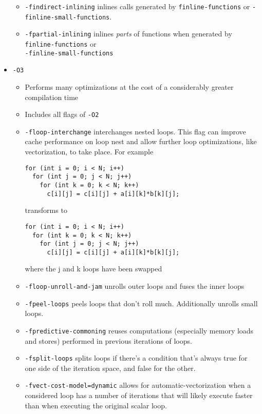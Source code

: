 \documentclass{article}
\begin{document}
\begin{itemize}
\begin{itemize}
                    \item \verb|-findirect-inlining| inlines calls generated by \verb|finline-functions| or \verb|-finline-small-functions|.
                    \item \verb|-fpartial-inlining| inlines \emph{parts} of functions when generated by \verb|finline-functions| or\\ \verb|-finline-small-functions|
                \end{itemize}
            \item \verb|-O3|
                \begin{itemize}
                    \item Performs many optimizations at the cost of a considerably greater compilation time
                    \item Includes all flags of \verb|-O2|
                    \item \verb|-floop-interchange| interchanges nested loops.  This flag can improve cache performance on loop nest and allow further loop optimizations, like vectorization, to take place. For example
                    \begin{verbatim}
for (int i = 0; i < N; i++)
  for (int j = 0; j < N; j++)
    for (int k = 0; k < N; k++)
      c[i][j] = c[i][j] + a[i][k]*b[k][j];
                    \end{verbatim}
                    transforms to 
                    \begin{verbatim}
for (int i = 0; i < N; i++)
  for (int k = 0; k < N; k++)
    for (int j = 0; j < N; j++)
      c[i][j] = c[i][j] + a[i][k]*b[k][j];
                    \end{verbatim}
                    where the j and k loops have been swapped
                    \item \verb|-floop-unroll-and-jam| unrolls outer loops and fuses the inner loops
                    \item \verb|-fpeel-loops| peels loops that don't roll much.  Additionally unrolls small loops.
                    \item \verb|-fpredictive-commoning| reuses computations (especially memory loads and stores) performed in previous iterations of loops. 
                    \item \verb|-fsplit-loops| splits loops if there's a condition that's always true for one side of the iteration space, and false for the other.
                    \item \verb|-fvect-cost-model=dynamic| allows for automatic-vectorization when a considered loop has a number of iterations that will likely execute faster than when executing the original scalar loop.

\end{itemize}
\end{itemize}
\end{document}
